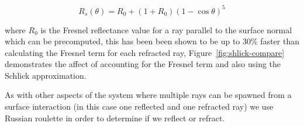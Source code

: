 \begin{equation}
R_s(\theta)=R_0 + \left(1 + R_0\right)\left(1 - \cos\theta\right)^5
\label{eq:schlick}
\end{equation}

where $R_0$ is the Fresnel reflectance value for a ray parallel to the surface normal which can be precomputed,
this has been been shown to be up to 30\% faster \cite{deGreve06} than calculating the Fresnel term for each refracted ray, Figure~\ref{fig:shlick-compare}
demonstrates the affect of accounting for the Fresnel term and also using the Schlick approximation.

As with other aspects of the system where multiple rays can be spawned from a surface interaction (in this case one reflected and one refracted ray)
we use Russian roulette in order to determine if we reflect or refract.

